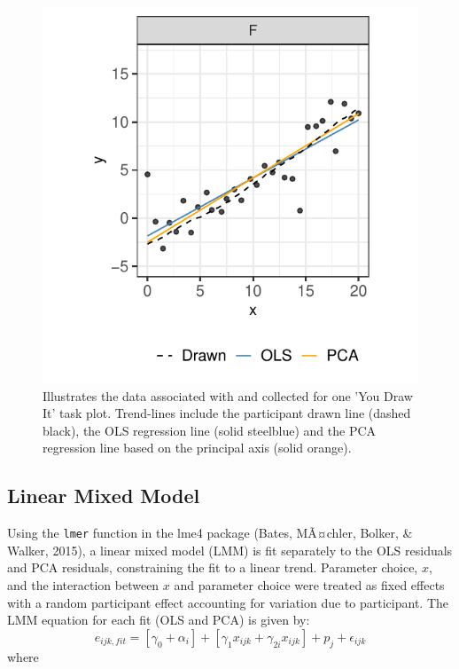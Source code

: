 \begin{appendix}
\begin{figure}
{\centering \includegraphics[width=0.75\linewidth]{./images/eyefitting-example-plot-1} 

}

\caption{Illustrates the data associated with and collected for one 'You Draw It' task plot. Trend-lines include the participant drawn line (dashed black), the OLS regression line (solid steelblue) and the PCA regression line based on the principal axis (solid orange).}\label{fig:eyefitting-example-plot}
\end{figure}

\hypertarget{linear-mixed-model}{%
\subsection{\texorpdfstring{Linear Mixed Model
\label{app:lmm-equation}}{Linear Mixed Model }}\label{linear-mixed-model}}

Using the \texttt{lmer} function in the lme4 package (Bates, MÃ¤chler,
Bolker, \& Walker, 2015), a linear mixed model (LMM) is fit separately
to the OLS residuals and PCA residuals, constraining the fit to a linear
trend. Parameter choice, \(x\), and the interaction between \(x\) and
parameter choice were treated as fixed effects with a random participant
effect accounting for variation due to participant. The LMM equation for
each fit (OLS and PCA) is given by: \begin{equation}
e_{ijk,fit} = \left[\gamma_0 + \alpha_i\right] + \left[\gamma_{1} x_{ijk} + \gamma_{2i} x_{ijk}\right] + p_{j} + \epsilon_{ijk}
\end{equation} \noindent where


\end{appendix}
